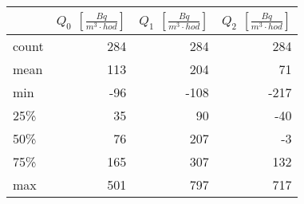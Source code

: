 \begin{tabular}{lrrr}
\toprule
{} &  $Q_0$ $\left[\si{\frac{Bq}{m^3\cdot hod}}\right]$ &  $Q_1$ $\left[\si{\frac{Bq}{m^3\cdot hod}}\right]$ &  $Q_2$ $\left[\si{\frac{Bq}{m^3\cdot hod}}\right]$ \\
\midrule
count &                                                284 &                                                284 &                                                284 \\
mean  &                                                113 &                                                204 &                                                 71 \\
min   &                                                -96 &                                               -108 &                                               -217 \\
25\%   &                                                 35 &                                                 90 &                                                -40 \\
50\%   &                                                 76 &                                                207 &                                                 -3 \\
75\%   &                                                165 &                                                307 &                                                132 \\
max   &                                                501 &                                                797 &                                                717 \\
\bottomrule
\end{tabular}
